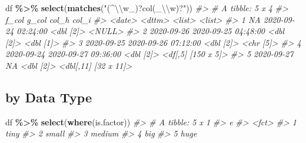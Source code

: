 \documentclass[
]{report}
\newenvironment{Shaded}{\begin{snugshade}}{\end{snugshade}}
\newcommand{\CharTok}[1]{\textcolor[rgb]{0.31,0.60,0.02}{#1}}
\newcommand{\CommentTok}[1]{\textcolor[rgb]{0.56,0.35,0.01}{\textit{#1}}}
\newcommand{\KeywordTok}[1]{\textcolor[rgb]{0.13,0.29,0.53}{\textbf{#1}}}
\newcommand{\NormalTok}[1]{#1}
\newcommand{\OperatorTok}[1]{\textcolor[rgb]{0.81,0.36,0.00}{\textbf{#1}}}
\newcommand{\StringTok}[1]{\textcolor[rgb]{0.31,0.60,0.02}{#1}}
\begin{document}
\begin{Shaded}
\begin{Highlighting}[]
\NormalTok{df }\OperatorTok{\%\textgreater{}\%}
\StringTok{  }\KeywordTok{select}\NormalTok{(}\KeywordTok{matches}\NormalTok{(}\StringTok{"(\^{}}\CharTok{\textbackslash{}\textbackslash{}}\StringTok{w\_)?col(\_}\CharTok{\textbackslash{}\textbackslash{}}\StringTok{w)?"}\NormalTok{))}
\CommentTok{\#\textgreater{} \# A tibble: 5 x 4}
\CommentTok{\#\textgreater{}   f\_col      g\_col               col\_h     col\_i               }
\CommentTok{\#\textgreater{}   \textless{}date\textgreater{}     \textless{}dttm\textgreater{}              \textless{}list\textgreater{}    \textless{}list\textgreater{}              }
\CommentTok{\#\textgreater{} 1 NA         2020{-}09{-}24 02:24:00 \textless{}dbl [2]\textgreater{} \textless{}NULL\textgreater{}              }
\CommentTok{\#\textgreater{} 2 2020{-}09{-}26 2020{-}09{-}25 04:48:00 \textless{}dbl [2]\textgreater{} \textless{}dbl [1]\textgreater{}           }
\CommentTok{\#\textgreater{} 3 2020{-}09{-}25 2020{-}09{-}26 07:12:00 \textless{}dbl [2]\textgreater{} \textless{}chr [5]\textgreater{}           }
\CommentTok{\#\textgreater{} 4 2020{-}09{-}24 2020{-}09{-}27 09:36:00 \textless{}dbl [2]\textgreater{} \textless{}df[,5] [150 x 5]\textgreater{}  }
\CommentTok{\#\textgreater{} 5 2020{-}09{-}27 NA                  \textless{}dbl [2]\textgreater{} \textless{}dbl[,11] [32 x 11]\textgreater{}}
\end{Highlighting}
\end{Shaded}

\hypertarget{by-data-type}{%
\subsection{by Data Type}\label{by-data-type}}

\begin{Shaded}
\begin{Highlighting}[]
\NormalTok{df }\OperatorTok{\%\textgreater{}\%}
\StringTok{  }\KeywordTok{select}\NormalTok{(}\KeywordTok{where}\NormalTok{(is.factor))}
\CommentTok{\#\textgreater{} \# A tibble: 5 x 1}
\CommentTok{\#\textgreater{}   e     }
\CommentTok{\#\textgreater{}   \textless{}fct\textgreater{} }
\CommentTok{\#\textgreater{} 1 tiny  }
\CommentTok{\#\textgreater{} 2 small }
\CommentTok{\#\textgreater{} 3 medium}
\CommentTok{\#\textgreater{} 4 big   }
\CommentTok{\#\textgreater{} 5 huge}
\end{Highlighting}
\end{Shaded}
\end{document}
